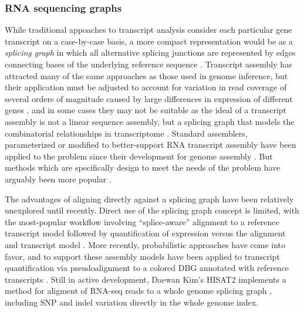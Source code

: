 
\subsubsection{RNA sequencing graphs}
\label{sec:rna_seq}

While traditional appoaches to transcript analysis consider each particular gene transcript on a case-by-case basis, a more compact representation would be as a \emph{splicing graph} in which all alternative splicing junctions are represented by edges connecting bases of the underlying reference sequence \cite{heber2002splicing,lee2002POA}.
Transcript assembly has attracted many of the same approaches as those used in genome inference, but their application must be adjusted to account for variation in read coverage of several orders of magnitude caused by large differences in expression of different genes \cite{martin2011next}, and in some cases they may not be suitable as the ideal of a transcript assembly is not a linear sequence assembly, but a splicing graph that models the combinatorial relationships in transcriptome \cite{grabherr2011trinity}.
Standard assemblers, parameterized or modified to better-support RNA transcript assembly have been applied to the problem since their development for genome assembly \cite{birol2009novo,robertson2010novo,grabherr2011full,schulz2012oases}.
But methods which are specifically design to meet the needs of the problem have arguably been more popular \cite{grabherr2011trinity,chang2015bridger}.

The advantages of aligning directly against a splicing graph have been relatively unexplored until recently.
Direct use of the splicing graph concept is limited, with the most-popular workflow involving ``splice-aware'' alignment to a reference transcript model followed by quantification of expression versus the alignment and transcript model \cite{trapnell2012differential}.
More recently, probabilistic approaches have come into favor, and to support these assembly models have been applied to transcript quantification via pseudoalignment to a colored DBG annotated with reference transcripts \cite{bray2016near}.
Still in active development, Daewan Kim's HISAT2 implements a method for aligment of RNA-seq reads to a whole genome splicing graph \cite{kim2015hisat,kim2017hisat2}, including SNP and indel variation directly in the whole genome index.


